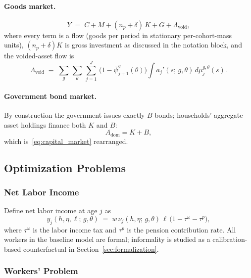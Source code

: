 \documentclass[12pt,a4paper]{article}
\begin{document}
\paragraph{Goods market.}
\begin{equation}
\label{eq:goods_market}
Y \;=\; C + M + (n_p + \delta)\, K + G + \Lambda_{\mathrm{void}},
\end{equation}
where every term is a flow (goods per period in stationary per-cohort-mass units), $(n_p + \delta) K$ is gross investment as discussed in the notation block, and the voided-asset flow is
\begin{equation}
\label{eq:leakage_voided}
\Lambda_{\mathrm{void}}
\;\equiv\;
\sum_g\, \sum_\theta\, \sum_{j=1}^{J}\, \bigl(1 - \bar\psi_{j+1}^{g}(\theta)\bigr)
\int a_j'(s;\, g, \theta)\, d\mu_{j}^{g,\theta}(s).
\end{equation}
\paragraph{Government bond market.}
By construction the government issues exactly $B$ bonds; households' aggregate asset holdings finance both $K$ and $B$:
\begin{equation}
A_{\mathrm{dom}} = K + B,
\end{equation}
which is~\eqref{eq:capital_market} rearranged.

\subsection{Optimization Problems}
\label{subsec:optimization}

\subsubsection{Net Labor Income}
\label{subsubsec:net_income}

Define net labor income at age $j$ as
\begin{equation}
\label{eq:net_labor_income}
y_j(h, \eta, \ell;\, g, \theta) \;=\; w\, \nu_j(h, \eta;\, g, \theta)\, \ell\, \bigl(1 - \tau^\omega - \tau^p\bigr),
\end{equation}
where $\tau^\omega$ is the labor income tax and $\tau^p$ is the pension contribution rate. All workers in the baseline model are formal; informality is studied as a calibration-based counterfactual in Section~\ref{sec:formalization}.

\subsubsection{Workers' Problem}
\label{subsubsec:worker}
\end{document}
